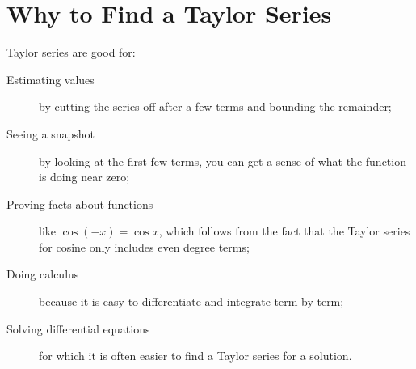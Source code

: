 \documentclass[11pt]{article}
\begin{document}
\vfill

\section*{Why to Find a Taylor Series}

Taylor series are good for:
\begin{description}
\item[Estimating values] by cutting the series off after a few terms and bounding the remainder;
\item[Seeing a snapshot] by looking at the first few terms, you can get a sense of what the function is doing near zero;
\item[Proving facts about functions] like $\cos (-x) = \cos x$, which follows from the fact that the Taylor series for cosine only includes even degree terms;
\item[Doing calculus] because it is easy to differentiate and integrate term-by-term;
\item[Solving differential equations] for which it is often easier to find a Taylor series for a solution.
\end{description}
\end{document}
